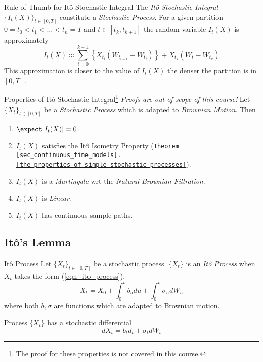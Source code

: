 \documentclass[11pt,a4paper]{article}
\begin{document}
  \begin{remark}{Rule of Thumb for It\^o Stochastic Integral}
    The \textit{It\^o Stochastic Integral} $\{I_t(X)\}_{t\in[0,T]}$ constitute a \textit{Stochastic Process}. For a given partition $0=t_0<t_1<\dots<t_n=T$ and $t\in[t_k,t_{k+1}]$ the random variable $I_t(X)$ is approximately
    \[ I_t(X)\approx\sum_{i=0}^{k-1}\left\{X_{t_i}(W_{t_{i-1}}-W_{t_i})\right\}+X_{t_k}(W_t-W_{t_k}) \]
    This approximation is closer to the value of $I_t(X)$ the denser the partition is in $[0,T]$.
  \end{remark}

  \begin{theorem}{Properties of It\^o Stochastic Integral\footnote{The proof for these properties is not covered in this course.}}\label{the_properties_of_ito_stochastic_integral}
    \textit{Proofs are out of scope of this course!}
    Let $\{X_t\}_{t\in[0,T]}$ be a \textit{Stochastic Process} which is adapted to \textit{Brownian Motion}. Then
    \begin{enumerate}
      \item $\expect[I_t(X)]=0$.
      \item $I_t(X)$ satisfies the It\^o Isometry Property (\texttt{Theorem \ref{sec_continuous_time_models}.\ref{the_properties_of_simple_stochastic_processes}}).
      \item $I_t(X)$ is a \textit{Martingale} wrt the \textit{Natural Brownian Filtration}.
      \item $I_t(X)$ is \textit{Linear}.
      \item $I_t(X)$ has continuous sample paths.
    \end{enumerate}
  \end{theorem}

\subsection{It\^o's Lemma}

  \begin{definition}{It\^o Process}
    Let $\{X_t\}_{t\in[0,T]}$ be a stochastic process. $\{X_t\}$ is an \textit{It\^o Process} when $X_t$ takes the form (\ref{eqn_ito_process}).
    \begin{equation}\label{eqn_ito_process}
      X_t=X_0+\int_0^tb_udu+\int_0^t\sigma_udW_u
    \end{equation}
    where both $b,\sigma$ are functions which are adapted to Brownian motion.
    \par Process $\{X_t\}$ has a stochastic differential
    \[ dX_t=b_td_t+\sigma_tdW_t \]
  \end{definition}
\end{document}
